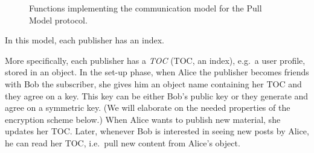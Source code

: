 \begin{figure}[p]
  \caption{%
    Functions implementing the communication model for the Pull Model protocol.
  }\label{PullFunctions}
\end{figure}

In this model, each publisher has an index.

More specifically, each publisher has a \emph{\acl{TOC}} (\acs{TOC}, an index), 
e.g.\ a user profile, stored in an object.
In the set-up phase, when Alice the publisher becomes friends with Bob the 
subscriber, she gives him an object name containing her \ac{TOC} and they agree 
on a key.
This key can be either Bob's public key or they generate and agree on 
a symmetric key.
(We will elaborate on the needed properties of the encryption scheme below.)
When Alice wants to publish new material, she updates her \ac{TOC}.
Later, whenever Bob is interested in seeing new posts by Alice, he can read her 
\ac{TOC}, i.e.\ pull new content from Alice's object.


